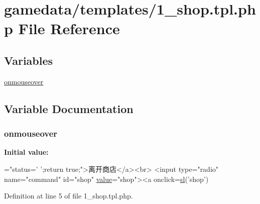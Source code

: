 \hypertarget{1__shop_8tpl_8php}{\section{gamedata/templates/1\+\_\+shop.tpl.\+php File Reference}
\label{1__shop_8tpl_8php}
}
\subsection*{Variables}
\begin{DoxyCompactItemize}
\item 
\hyperlink{1__shop_8tpl_8php_a173ad0b8dd7cdc083187410c5d906552}{onmouseover}
\end{DoxyCompactItemize}


\subsection{Variable Documentation}
\hypertarget{1__shop_8tpl_8php_a173ad0b8dd7cdc083187410c5d906552}{
\subsubsection[{onmouseover}]{\setlength{\rightskip}{0pt plus 5cm}onmouseover}}\label{1__shop_8tpl_8php_a173ad0b8dd7cdc083187410c5d906552}
{\bfseries Initial value\+:}
\begin{DoxyCode}
=\textcolor{stringliteral}{"status=' ';return true;"}>离开商店</a><br>
<input type=\textcolor{stringliteral}{"radio"} name=\textcolor{stringliteral}{"command"} \textcolor{keywordtype}{id}=\textcolor{stringliteral}{"shop"} \hyperlink{1__alive_8tpl_8php_afcc7a4b78ecd8fa7e713f8cfa0f51017}{value}=\textcolor{stringliteral}{"shop"}><a onclick=\hyperlink{game_8js_af54acd07f9caa4a5da77f0ba062ee7fe}{sl}(\textcolor{stringliteral}{'shop'})
\end{DoxyCode}


Definition at line 5 of file 1\+\_\+shop.\+tpl.\+php.

